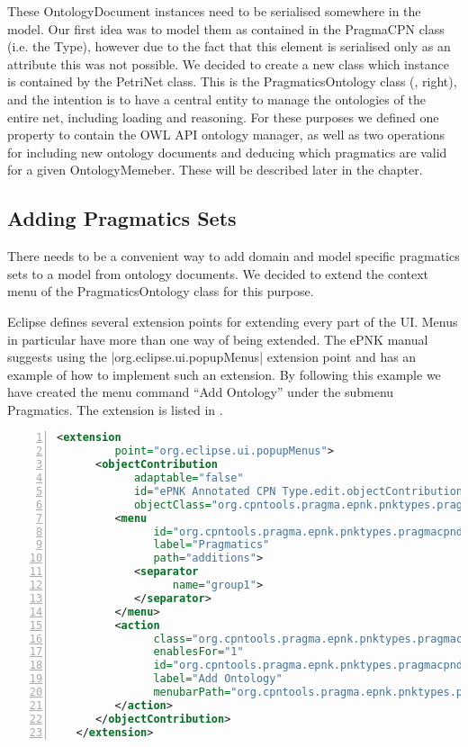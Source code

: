 These OntologyDocument instances need to be serialised somewhere in the model.
Our first idea was to model them as contained in the PragmaCPN class (i.e.
the Type), however due to the fact that this element is serialised only as an
attribute this was not possible. We decided to create a new class which instance
is contained by the PetriNet class. This is the PragmaticsOntology class
(, right), and the intention is to have a central
entity to manage the ontologies of the entire net, including loading and
reasoning. For these purposes we defined one property to contain the OWL API
ontology manager, as well as two operations for including new ontology documents
and deducing which pragmatics are valid for a given OntologyMemeber. These will
be described later in the chapter.

\subsection{Adding Pragmatics Sets}\label{sec:menufirsttime}
There needs to be a convenient way to add domain and model specific pragmatics
sets to a model from ontology documents. We decided to extend the context menu
of the PragmaticsOntology class for this purpose.

Eclipse defines several extension points for extending every part of the UI.
Menus in particular have more than one way of being extended. The ePNK manual
suggests using the |org.eclipse.ui.popupMenus| extension point and has an
example of how to implement such an extension. By following this example we have
created the menu command ``Add Ontology'' under the submenu Pragmatics. The
extension is listed in . 

\begin{lstlisting}[language=XML,float,label=lst:addOntologyMenu,numbers=left,stepnumber=1,
caption=Add Ontology Menu Extension]
   <extension
         point="org.eclipse.ui.popupMenus">
      <objectContribution
            adaptable="false"
            id="ePNK Annotated CPN Type.edit.objectContribution1"
            objectClass="org.cpntools.pragma.epnk.pnktypes.pragmacpndefinition.PragmaticsOntology">
         <menu
               id="org.cpntools.pragma.epnk.pnktypes.pragmacpndefinition.actions.standardmenu"
               label="Pragmatics"
               path="additions">
            <separator
                  name="group1">
            </separator>
         </menu>
         <action
               class="org.cpntools.pragma.epnk.pnktypes.pragmacpndefinition.menu.AddOntologyAction"
               enablesFor="1"
               id="org.cpntools.pragma.epnk.pnktypes.pragmacpndefinition.actions.AddOntologyAction"
               label="Add Ontology"
               menubarPath="org.cpntools.pragma.epnk.pnktypes.pragmacpndefinition.actions.standardmenu/group1">
         </action>
      </objectContribution>
   </extension>
\end{lstlisting}

